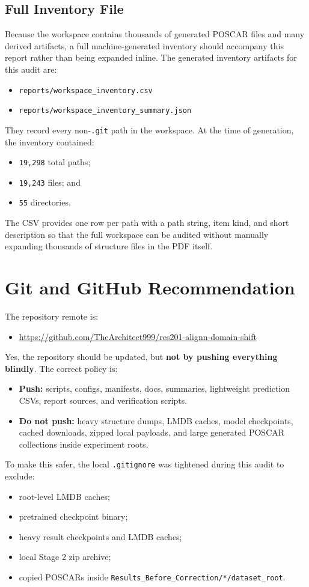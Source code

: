 \documentclass[11pt]{article}
\begin{document}
\subsection{Full Inventory File}
Because the workspace contains thousands of generated POSCAR files and many derived artifacts, a full machine-generated inventory should accompany this report rather than being expanded inline.
The generated inventory artifacts for this audit are:
\begin{itemize}
  \item \texttt{reports/workspace\_inventory.csv}
  \item \texttt{reports/workspace\_inventory\_summary.json}
\end{itemize}
They record every non-\texttt{.git} path in the workspace.
At the time of generation, the inventory contained:
\begin{itemize}
  \item \texttt{19,298} total paths;
  \item \texttt{19,243} files; and
  \item \texttt{55} directories.
\end{itemize}
The CSV provides one row per path with a path string, item kind, and short description so that the full workspace can be audited without manually expanding thousands of structure files in the PDF itself.

\section{Git and GitHub Recommendation}
The repository remote is:
\begin{itemize}
  \item \url{https://github.com/TheArchitect999/res201-alignn-domain-shift}
\end{itemize}

Yes, the repository should be updated, but \textbf{not by pushing everything blindly}.
The correct policy is:
\begin{itemize}
  \item \textbf{Push:} scripts, configs, manifests, docs, summaries, lightweight prediction CSVs, report sources, and verification scripts.
  \item \textbf{Do not push:} heavy structure dumps, LMDB caches, model checkpoints, cached downloads, zipped local payloads, and large generated POSCAR collections inside experiment roots.
\end{itemize}

To make this safer, the local \texttt{.gitignore} was tightened during this audit to exclude:
\begin{itemize}
  \item root-level LMDB caches;
  \item pretrained checkpoint binary;
  \item heavy result checkpoints and LMDB caches;
  \item local Stage 2 zip archive;
  \item copied POSCARs inside \texttt{Results_Before_Correction/*/dataset\_root}.
\end{itemize}
\end{document}
